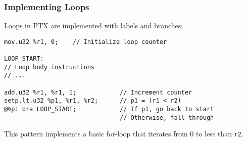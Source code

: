 \subsubsection{Implementing Loops}

Loops in PTX are implemented with labels and branches:

\begin{lstlisting}[style=ptx]
mov.u32 %r1, 0;    // Initialize loop counter

LOOP_START:
// Loop body instructions
// ...

add.u32 %r1, %r1, 1;            // Increment counter
setp.lt.u32 %p1, %r1, %r2;      // p1 = (r1 < r2)
@%p1 bra LOOP_START;            // If p1, go back to start
                                // Otherwise, fall through
\end{lstlisting}

This pattern implements a basic for-loop that iterates from 0 to less than \texttt{r2}.


